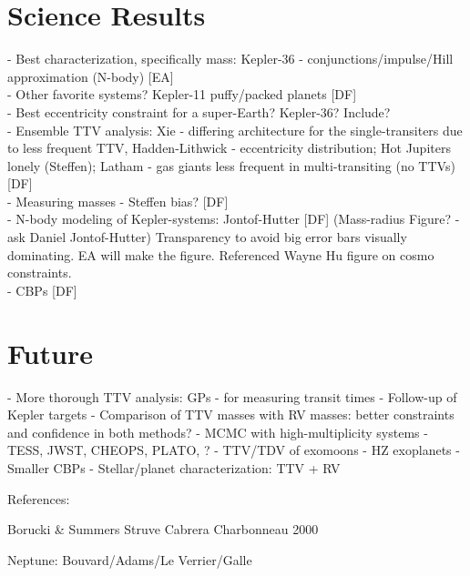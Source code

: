 \documentclass[graybox,natbib,nosecnum]{svmult}
\begin{document}
\section{Science Results}
    - Best characterization, specifically mass: Kepler-36 - conjunctions/impulse/Hill approximation (N-body) [EA]\\
    - Other favorite systems? Kepler-11 puffy/packed planets  [DF]\\
    - Best eccentricity constraint for a super-Earth?  Kepler-36? Include? \\
    - Ensemble TTV analysis: Xie - differing architecture for the single-transiters due to less frequent TTV, Hadden-Lithwick - eccentricity distribution; Hot Jupiters lonely (Steffen); Latham     - gas giants less frequent in multi-transiting (no TTVs)  [DF]\\
    - Measuring masses - Steffen bias?    [DF]\\
    - N-body modeling of Kepler-systems: Jontof-Hutter  [DF] (Mass-radius Figure? - ask Daniel Jontof-Hutter)  Transparency to avoid big error bars visually dominating.  EA will make the figure.  Referenced Wayne Hu figure on cosmo constraints.\\
    - CBPs   [DF]

\section{Future} %
  - More thorough TTV analysis: GPs - for measuring transit times
  - Follow-up of Kepler targets
  - Comparison of TTV masses with RV masses:  better constraints
    and confidence in both methods?
  - MCMC with high-multiplicity systems
  - TESS, JWST, CHEOPS, PLATO, ?
  - TTV/TDV of exomoons
  - HZ exoplanets
  - Smaller CBPs
  - Stellar/planet characterization: TTV + RV

References:

Borucki \& Summers
Struve
Cabrera
Charbonneau 2000

Neptune:
Bouvard/Adams/Le Verrier/Galle

\end{document}
